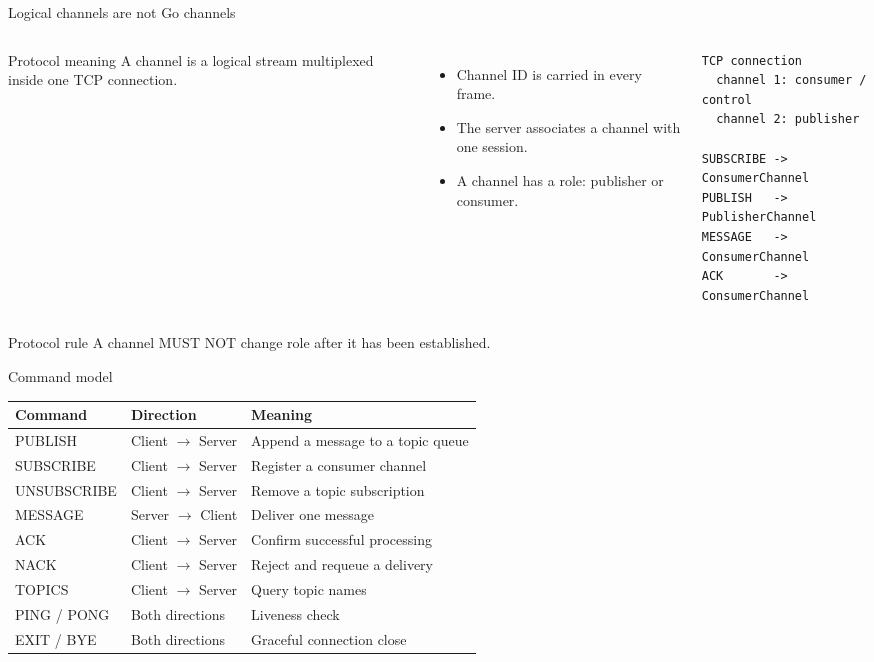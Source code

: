 \documentclass[aspectratio=169,10pt]{beamer}
\begin{document}
\begin{frame}[fragile]{Logical channels are not Go channels}
  \begin{columns}[T,onlytextwidth]
    \begin{block}{Protocol meaning}
      A channel is a logical stream multiplexed inside one TCP connection.
    \end{block}
    \begin{itemize}
      \item Channel ID is carried in every frame.
      \item The server associates a channel with one session.
      \item A channel has a role: publisher or consumer.
    \end{itemize}
    \begin{lstlisting}[style=wire]
TCP connection
  channel 1: consumer / control
  channel 2: publisher

SUBSCRIBE -> ConsumerChannel
PUBLISH   -> PublisherChannel
MESSAGE   -> ConsumerChannel
ACK       -> ConsumerChannel
    \end{lstlisting}
  \end{columns}
  \vspace{.3em}
  \begin{alertblock}{Protocol rule}
    A channel MUST NOT change role after it has been established.
  \end{alertblock}
\end{frame}

\begin{frame}{Command model}
  \small
  \begin{tabular}{>{\ttfamily}p{}p{}p{}}
    \toprule
    Command & Direction & Meaning \\
    \midrule
    PUBLISH & Client $\rightarrow$ Server & Append a message to a topic queue \\
    SUBSCRIBE & Client $\rightarrow$ Server & Register a consumer channel \\
    UNSUBSCRIBE & Client $\rightarrow$ Server & Remove a topic subscription \\
    MESSAGE & Server $\rightarrow$ Client & Deliver one message \\
    ACK & Client $\rightarrow$ Server & Confirm successful processing \\
    NACK & Client $\rightarrow$ Server & Reject and requeue a delivery \\
    TOPICS & Client $\rightarrow$ Server & Query topic names \\
    PING / PONG & Both directions & Liveness check \\
    EXIT / BYE & Both directions & Graceful connection close \\
    \bottomrule
  \end{tabular}
\end{frame}
\end{document}
